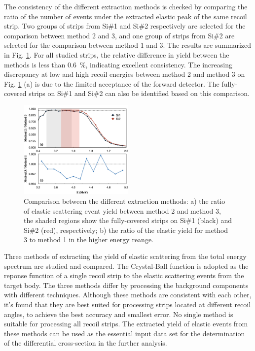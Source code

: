 \documentclass[fleqn,twocolumn,a4paper]{ikpar}
\begin{document}
The consistency of the different extraction methods is checked by comparing the
ratio of the number of events under the extracted elastic peak of the same recoil strip.
Two groups of strips from Si\#1 and Si\#2 respectively are selected for the
comparison between method 2 and 3, and one group of strips from Si\#2 are selected
for the comparison between method 1 and 3.
The results are summarized in Fig. \ref{fig:extraction_consistence}.
For all studied strips, the relative difference in yield between the methods is
less than \SI{0.6}{\percent}, indicating excellent consistency.
The increasing discrepancy at low and high recoil energies between method 2 and
method 3 on Fig. \ref{fig:extraction_consistence} (a) is due to the limited
acceptance of the forward detector.
The fully-covered strips on Si\#1 and Si\#2 can also be identified based on this comparison.
\begin{figure}[!htb]
	\includegraphics[width=0.5\textwidth]{./comparison_methods.png}
  \caption{Comparison between the different extraction
    methods: a) the ratio of elastic scattering event yield between method 2 and
    method 3, the shaded regions show the fully-covered strips on Si\#1
    (black) and Si\#2 (red), respectively; b) the ratio of the elastic yield for
    method 3 to method 1 in the higher energy reange.}
  \label{fig:extraction_consistence}
\end{figure}

\par
\medskip

Three methods of extracting the yield of elastic scattering from the total
energy spectrum are studied and compared.
The Crystal-Ball function is adopted as the reponse function of a single recoil strip to the
elastic scattering events from the target body.
The three methods differ by processing the background components with different techniques.
Although these methods are consistent with each other, it's found that they are best suited for
processing strips located at different recoil angles, to achieve the best accuracy
and smallest error.
No single method is suitable for processing all recoil strips.
The extracted yield of elastic events from these methods can be used as
the essential input data set for the determination of the differential cross-section in the further analysis.
\end{document}
